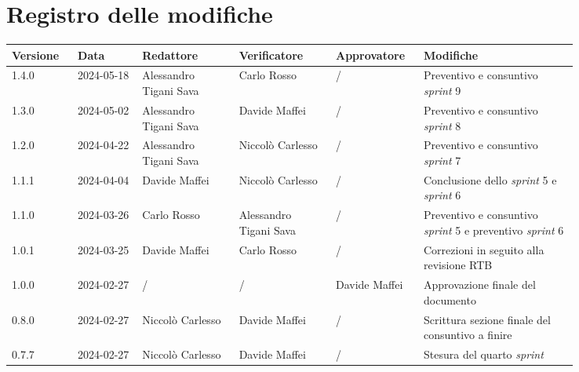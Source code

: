 \section*{Registro delle modifiche}
 {
  \renewcommand{\arraystretch}{1.5}
  \scriptsize
  \begin{longtable}{p{0.10\linewidth}p{0.10\linewidth}p{0.15\linewidth}p{0.15\linewidth}p{0.10\linewidth}p{0.24\linewidth}}
	  \textbf{Versione} & \textbf{Data} & \textbf{Redattore}     & \textbf{Verificatore}  & \textbf{Approvatore} & \textbf{Modifiche}                                                       \\
	  \toprule
	  1.4.0             & 2024-05-18    & Alessandro Tigani Sava & Carlo Rosso            & /                    & Preventivo e consuntivo \textit{sprint} 9                                \\
	  \hline
	  1.3.0             & 2024-05-02    & Alessandro Tigani Sava & Davide Maffei          & /                    & Preventivo e consuntivo \textit{sprint} 8                                \\
	  \hline
	  1.2.0             & 2024-04-22    & Alessandro Tigani Sava & Niccolò Carlesso       & /                    & Preventivo e consuntivo \textit{sprint} 7                                \\
	  \hline
	  1.1.1             & 2024-04-04    & Davide Maffei          & Niccolò Carlesso       & /                    & Conclusione dello \textit{sprint} 5 e \textit{sprint} 6                  \\
	  \hline
	  1.1.0             & 2024-03-26    & Carlo Rosso            & Alessandro Tigani Sava & /                    & Preventivo e consuntivo \textit{sprint} 5 e preventivo \textit{sprint} 6 \\
	  \hline
	  1.0.1             & 2024-03-25    & Davide Maffei          & Carlo Rosso            & /                    & Correzioni in seguito alla revisione RTB                                 \\
	  \hline
	  1.0.0             & 2024-02-27    & /                      & /                      & Davide Maffei        & Approvazione finale del documento                                        \\
	  \hline
	  0.8.0             & 2024-02-27    & Niccolò Carlesso       & Davide Maffei          & /                    & Scrittura sezione finale del consuntivo a finire                         \\
	  \hline
	  0.7.7             & 2024-02-27    & Niccolò Carlesso       & Davide Maffei          & /                    & Stesura del quarto \textit{sprint}                                       \\

\end{longtable}}
